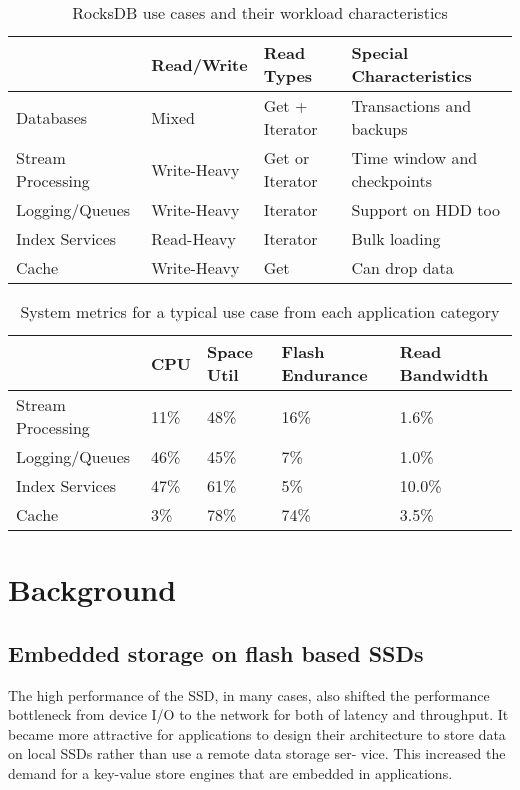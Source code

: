\documentclass[11pt]{article}
\begin{document}
\begin{table}[htbp]
\caption{RocksDB use cases and their workload characteristics}
\centering
\begin{tabular}{llll}
\hline
 & Read/Write & Read Types & Special Characteristics\\
\hline
Databases & Mixed & Get + Iterator & Transactions and backups\\
Stream Processing & Write-Heavy & Get or Iterator & Time window and checkpoints\\
Logging/Queues & Write-Heavy & Iterator & Support on HDD too\\
Index Services & Read-Heavy & Iterator & Bulk loading\\
Cache & Write-Heavy & Get & Can drop data\\
\hline
\end{tabular}
\end{table}


\begin{table}[htbp]
\caption{System metrics for a typical use case from each application category}
\centering
\begin{tabular}{lllll}
\hline
 & CPU & Space Util & Flash Endurance & Read Bandwidth\\
\hline
Stream Processing & 11\% & 48\% & 16\% & 1.6\%\\
Logging/Queues & 46\% & 45\% & 7\% & 1.0\%\\
Index Services & 47\% & 61\% & 5\% & 10.0\%\\
Cache & 3\% & 78\% & 74\% & 3.5\%\\
\hline
\end{tabular}
\end{table}
\section{Background}
\label{sec:org7dae739}
\subsection{Embedded storage on flash based SSDs}
\label{sec:org3f768f2}
The high performance of the SSD, in many cases, also shifted the performance bottleneck from device
I/O to the network for both of latency and throughput. It became more attractive for applications to
design their architecture to store data on local SSDs rather than use a remote data storage ser- vice.
This increased the demand for a key-value store engines that are embedded in applications.
\end{document}
